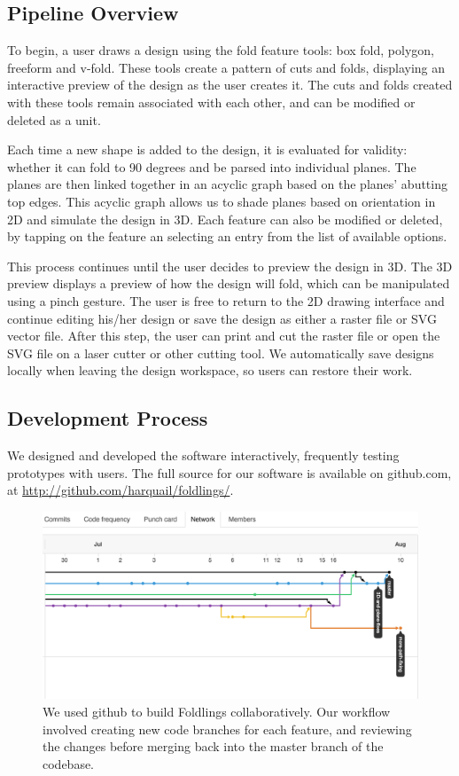 \subsection{Pipeline Overview}\label{pipeline-overview}

To begin, a user draws a design using the fold feature tools: box fold,
polygon, freeform and v-fold. These tools create a pattern of cuts and
folds, displaying an interactive preview of the design as the user
creates it. The cuts and folds created with these tools remain
associated with each other, and can be modified or deleted as a unit.

Each time a new shape is added to the design, it is evaluated for
validity: whether it can fold to 90 degrees and be parsed into
individual planes. The planes are then linked together in an acyclic
graph based on the planes' abutting top edges. This acyclic graph allows
us to shade planes based on orientation in 2D and simulate the design in
3D. Each feature can also be modified or deleted, by tapping on the
feature an selecting an entry from the list of available options.

This process continues until the user decides to preview the design in
3D. The 3D preview displays a preview of how the design will fold, which
can be manipulated using a pinch gesture. The user is free to return to
the 2D drawing interface and continue editing his/her design or save the
design as either a raster file or SVG vector file. After this step, the
user can print and cut the raster file or open the SVG file on a laser
cutter or other cutting tool. We automatically save designs locally when
leaving the design workspace, so users can restore their work.

\subsection{Development Process}\label{development-process}

We designed and developed the software interactively, frequently testing
prototypes with users. The full source for our software is available on
github.com, at \url{http://github.com/harquail/foldlings/}.

\begin{figure}[htbp]
\centering
\includegraphics{figures/30_UI_Design_Philosophy/gitflow.png}
\caption{We used github to build Foldlings collaboratively. Our workflow
involved creating new code branches for each feature, and reviewing the
changes before merging back into the master branch of the codebase.}
\end{figure}
